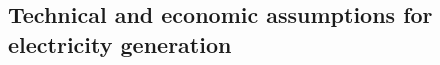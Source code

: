\begin{landscape}
\subsection{Technical and economic assumptions for electricity generation}


















\end{landscape}